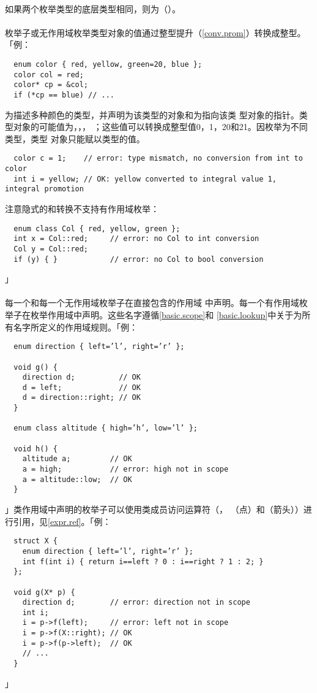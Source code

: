 \paragraph{}
如果两个枚举类型的底层类型相同，则为（）。

\paragraph{}
枚举子或无作用域枚举类型对象的值通过整型提升（\ref{conv.prom}）转换成整型。
「例：
\begin{lstlisting}
  enum color { red, yellow, green=20, blue };
  color col = red;
  color* cp = &col;
  if (*cp == blue) // ...
\end{lstlisting}
为描述多种颜色的类型，并声明为该类型的对象和为指向该类
型对象的指针。类型对象的可能值为，，，
；这些值可以转换成整型值0，1，20和21。因枚举为不同类型，类型
对象只能赋以类型的值。
\begin{lstlisting}
  color c = 1;    // error: type mismatch, no conversion from int to color
  int i = yellow; // OK: yellow converted to integral value 1, integral promotion
\end{lstlisting}
注意隐式的和转换不支持有作用域枚举：
\begin{lstlisting}
  enum class Col { red, yellow, green };
  int x = Col::red;     // error: no Col to int conversion
  Col y = Col::red;
  if (y) { }            // error: no Col to bool conversion
\end{lstlisting}」

\paragraph{}
每一个和每一个无作用域枚举子在直接包含的作用域
中声明。每一个有作用域枚举子在枚举作用域中声明。这些名字遵循\ref{basic.scope}和
\ref{basic.lookup}中关于为所有名字所定义的作用域规则。「例：
\begin{lstlisting}
  enum direction { left=’l’, right=’r’ };

  void g() {
    direction d;          // OK
    d = left;             // OK
    d = direction::right; // OK
  }

  enum class altitude { high=’h’, low=’l’ };

  void h() {
    altitude a;         // OK
    a = high;           // error: high not in scope
    a = altitude::low;  // OK
  }
\end{lstlisting}」类作用域中声明的枚举子可以使用类成员访问运算符（\tm{::}，
（点）和\tm{->}（箭头））进行引用，见\ref{expr.ref}。「例：
\begin{lstlisting}
  struct X {
    enum direction { left=’l’, right=’r’ };
    int f(int i) { return i==left ? 0 : i==right ? 1 : 2; }
  };

  void g(X* p) {
    direction d;        // error: direction not in scope
    int i;
    i = p->f(left);     // error: left not in scope
    i = p->f(X::right); // OK
    i = p->f(p->left);  // OK
    // ...
  }
\end{lstlisting}」

